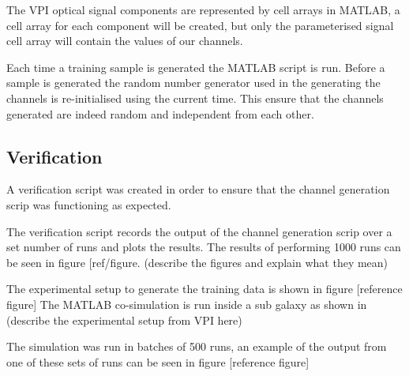 The VPI optical signal components are represented by cell arrays in MATLAB, a cell array for each component will be created, but only the parameterised signal cell array will contain the values of our channels.  

Each time a training sample is generated the MATLAB script is run. Before a sample is generated the random number generator used in the generating the channels is re-initialised using the current time. This ensure that the channels generated are indeed random and independent from each other. 


\subsection{Verification}	
A verification script was created in order to ensure that the channel generation scrip was functioning as expected.

The verification script records the output of the channel generation scrip over a set number of runs and plots the results. The results of performing 1000 runs can be seen in figure [ref/figure. (describe the figures and explain what they mean)



The experimental setup to generate the training data is shown in figure [reference figure]
The MATLAB co-simulation is run inside a sub galaxy as shown in 
(describe the experimental setup from VPI here)

The simulation was run in batches of 500 runs, an example of the output from one of these sets of runs can be seen in figure [reference figure]


